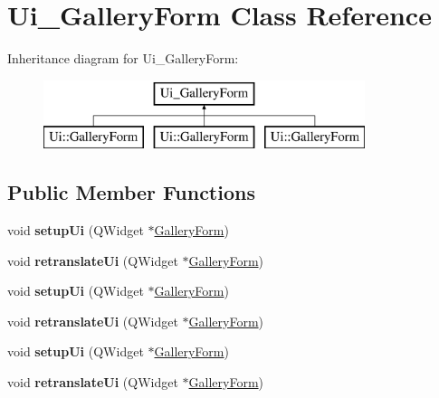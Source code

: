 \hypertarget{class_ui___gallery_form}{}\section{Ui\+\_\+\+Gallery\+Form Class Reference}
\label{class_ui___gallery_form}
Inheritance diagram for Ui\+\_\+\+Gallery\+Form\+:\begin{figure}[H]
\begin{center}
\leavevmode
\includegraphics[height=2.000000cm]{class_ui___gallery_form}
\end{center}
\end{figure}
\subsection*{Public Member Functions}
\begin{DoxyCompactItemize}
\item 
\mbox{\label{class_ui___gallery_form_a8d1cad42443267f9c604ed6df2a6ba83}} 
void {\bfseries setup\+Ui} (Q\+Widget $\ast$\hyperlink{class_gallery_form}{Gallery\+Form})
\item 
\mbox{\label{class_ui___gallery_form_ad46d3ed821ae893905232ca00cf1adce}} 
void {\bfseries retranslate\+Ui} (Q\+Widget $\ast$\hyperlink{class_gallery_form}{Gallery\+Form})
\item 
\mbox{\label{class_ui___gallery_form_a8d1cad42443267f9c604ed6df2a6ba83}} 
void {\bfseries setup\+Ui} (Q\+Widget $\ast$\hyperlink{class_gallery_form}{Gallery\+Form})
\item 
\mbox{\label{class_ui___gallery_form_ad46d3ed821ae893905232ca00cf1adce}} 
void {\bfseries retranslate\+Ui} (Q\+Widget $\ast$\hyperlink{class_gallery_form}{Gallery\+Form})
\item 
\mbox{\label{class_ui___gallery_form_a8d1cad42443267f9c604ed6df2a6ba83}} 
void {\bfseries setup\+Ui} (Q\+Widget $\ast$\hyperlink{class_gallery_form}{Gallery\+Form})
\item 
\mbox{\label{class_ui___gallery_form_ad46d3ed821ae893905232ca00cf1adce}} 
void {\bfseries retranslate\+Ui} (Q\+Widget $\ast$\hyperlink{class_gallery_form}{Gallery\+Form})
\end{DoxyCompactItemize}
